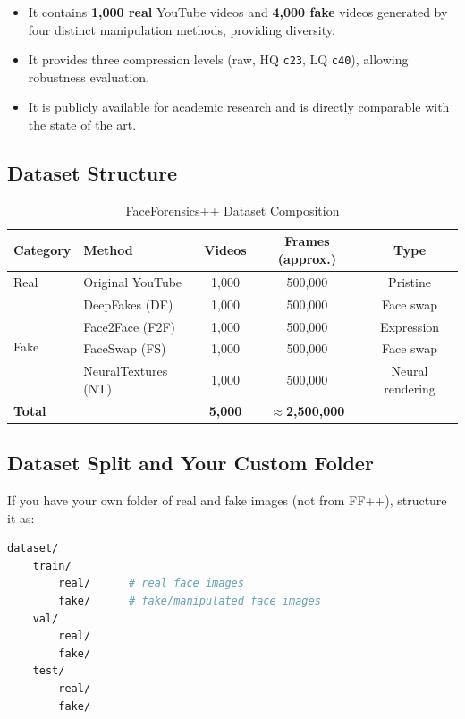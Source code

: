 \documentclass[12pt,a4paper]{article}
\begin{document}
\begin{itemize}[leftmargin=1.5em]
  \item It contains \textbf{1,000 real} YouTube videos and \textbf{4,000 fake} videos
    generated by four distinct manipulation methods, providing diversity.
  \item It provides three compression levels (raw, HQ \texttt{c23}, LQ \texttt{c40}),
    allowing robustness evaluation.
  \item It is publicly available for academic research and is directly comparable with
    the state of the art.
\end{itemize}

\subsection{Dataset Structure}

\begin{table}[h]
\centering
\caption{FaceForensics++ Dataset Composition}
\begin{tabular}{llccc}
\toprule
\textbf{Category} & \textbf{Method} & \textbf{Videos} & \textbf{Frames (approx.)} & \textbf{Type} \\
\midrule
Real & Original YouTube & 1,000 & 500,000 & Pristine \\
\midrule
\multirow{4}{*}{Fake}
  & DeepFakes (DF)       & 1,000 & 500,000 & Face swap \\
  & Face2Face (F2F)      & 1,000 & 500,000 & Expression \\
  & FaceSwap (FS)        & 1,000 & 500,000 & Face swap \\
  & NeuralTextures (NT)  & 1,000 & 500,000 & Neural rendering \\
\midrule
\textbf{Total} & & \textbf{5,000} & $\approx$\textbf{2,500,000} & \\
\bottomrule
\end{tabular}
\end{table}

\subsection{Dataset Split and Your Custom Folder}

If you have your own folder of real and fake images (not from FF++), structure it as:

\begin{lstlisting}[caption={Required folder structure for training}, language=bash]
dataset/
    train/
        real/      # real face images
        fake/      # fake/manipulated face images
    val/
        real/
        fake/
    test/
        real/
        fake/
\end{lstlisting}
\end{document}
